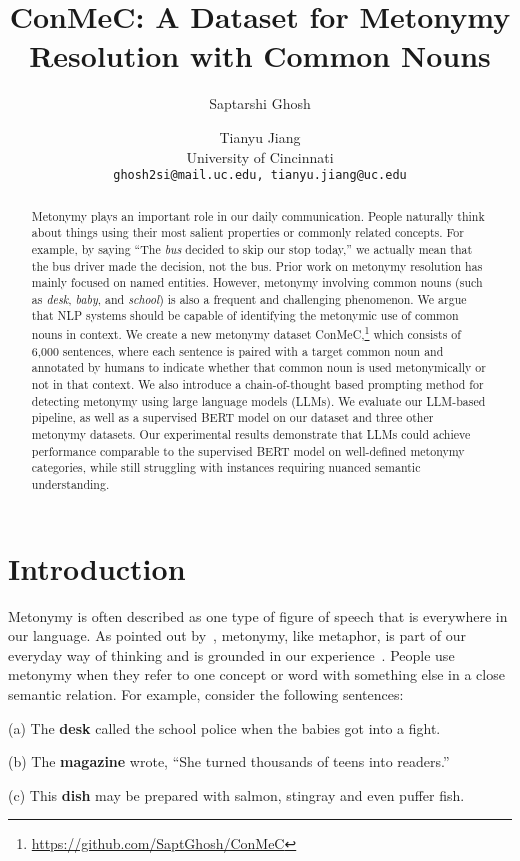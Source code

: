 \documentclass[11pt]{article}
\title{ConMeC: A Dataset for Metonymy Resolution with Common Nouns}
\author{Saptarshi Ghosh \and Tianyu Jiang \\
  University of Cincinnati \\
  \texttt{ghosh2si@mail.uc.edu, tianyu.jiang@uc.edu} \\}
\begin{document}
\maketitle
\begin{abstract}

Metonymy plays an important role in our daily communication. People naturally think about things using their most salient properties or commonly related concepts. For example, by saying ``The \textit{bus} decided to skip our stop today,'' we actually mean that the bus driver made the decision, not the bus. Prior work on metonymy resolution has mainly focused on named entities. However, metonymy involving common nouns (such as \textit{desk}, \textit{baby}, and \textit{school}) is also a frequent and challenging phenomenon. We argue that NLP systems should be capable of identifying the metonymic use of common nouns in context. We create a new metonymy dataset ConMeC,\footnote{\url{https://github.com/SaptGhosh/ConMeC}} which consists of 6,000 sentences, where each sentence is paired with a target common noun and annotated by humans to indicate whether that common noun is used metonymically or not in that context. We also introduce a chain-of-thought based prompting method for detecting metonymy using large language models (LLMs). We evaluate our LLM-based pipeline, as well as a supervised BERT model on our dataset and three other metonymy datasets. Our experimental results demonstrate that LLMs could achieve performance comparable to the supervised BERT model on well-defined metonymy categories, while still struggling with instances requiring nuanced semantic understanding.

\end{abstract}

\section{Introduction}

Metonymy is often described as one type of figure of speech that is everywhere in our language. As pointed out by~\citet{lakoff1980}, metonymy, like metaphor, is part of our everyday way of thinking and is grounded in our experience~\citep{radden}. People use metonymy when they refer to one concept or word with something else in a close semantic relation. For example, consider the following sentences:


\begin{quoting}[font={itshape, raggedright, noindent}, leftmargin=1em, rightmargin=0in]
(a) The \textbf{desk} called the school police when the babies got into a fight.
\vspace{0.5em}

(b) The \textbf{magazine} wrote, ``She turned thousands of teens into readers.''
\vspace{0.5em}

(c) This \textbf{dish} may be prepared with salmon, stingray and even puffer fish.
\vspace{0.5em}
\end{quoting}
\end{document}
